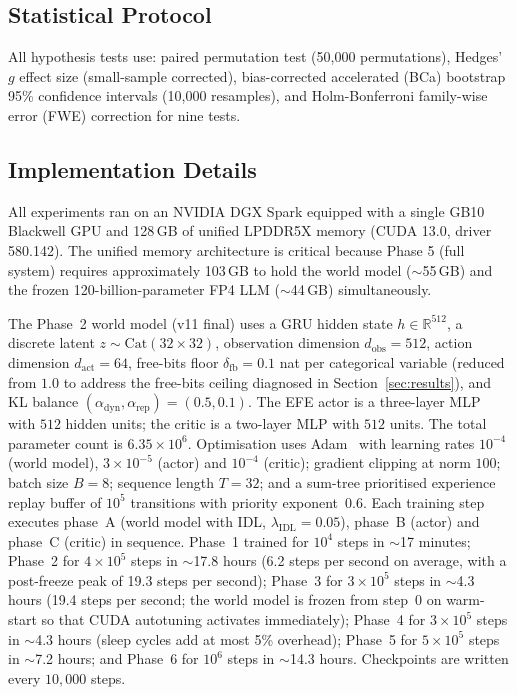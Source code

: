 \documentclass[journal,onecolumn,11pt]{IEEEtran}
\begin{document}
\subsection{Statistical Protocol}

All hypothesis tests use:
paired permutation test (50{,}000 permutations),
Hedges' $g$ effect size (small-sample corrected),
bias-corrected accelerated (BCa) bootstrap 95\% confidence intervals
(10{,}000 resamples),
and Holm-Bonferroni family-wise error (FWE) correction for nine tests.

\subsection{Implementation Details}

All experiments ran on an NVIDIA DGX Spark equipped with a single GB10
Blackwell GPU and 128\,GB of unified LPDDR5X memory (CUDA 13.0, driver
580.142).
The unified memory architecture is critical because Phase 5 (full system)
requires approximately 103\,GB to hold the world model ($\sim$55\,GB) and the
frozen 120-billion-parameter FP4 LLM ($\sim$44\,GB) simultaneously.

The Phase~2 world model (v11 final) uses a GRU hidden state
$h \in \mathbb{R}^{512}$, a discrete latent $z \sim \text{Cat}(32{\times}32)$,
observation dimension $d_{\text{obs}}=512$, action dimension
$d_{\text{act}}=64$, free-bits floor $\delta_{\text{fb}} = 0.1$ nat per
categorical variable (reduced from $1.0$ to address the free-bits ceiling
diagnosed in Section~\ref{sec:results}), and KL balance
$(\alpha_{\text{dyn}}, \alpha_{\text{rep}}) = (0.5, 0.1)$.
The EFE actor is a three-layer MLP with $512$ hidden units; the critic is a
two-layer MLP with $512$ units.
The total parameter count is $6.35\times 10^{6}$.
Optimisation uses Adam~\cite{kingma2014adam} with learning rates
$10^{-4}$ (world model), $3\times 10^{-5}$ (actor) and $10^{-4}$ (critic);
gradient clipping at norm $100$; batch size $B=8$; sequence length $T=32$;
and a sum-tree prioritised experience replay buffer of $10^{5}$ transitions
with priority exponent~$0.6$.
Each training step executes phase~A (world model with IDL,
$\lambda_{\text{IDL}} = 0.05$), phase~B (actor) and phase~C (critic) in
sequence.
Phase~1 trained for $10^{4}$ steps in $\sim$17 minutes;
Phase~2 for $4\times 10^{5}$ steps in $\sim$17.8 hours (6.2 steps per second
on average, with a post-freeze peak of 19.3 steps per second);
Phase~3 for $3\times 10^{5}$ steps in $\sim$4.3 hours (19.4 steps per
second; the world model is frozen from step~$0$ on warm-start so that
CUDA autotuning activates immediately);
Phase~4 for $3\times 10^{5}$ steps in $\sim$4.3 hours (sleep cycles add at
most 5\% overhead);
Phase~5 for $5\times 10^{5}$ steps in $\sim$7.2 hours;
and Phase~6 for $10^{6}$ steps in $\sim$14.3 hours.
Checkpoints are written every $10{,}000$ steps.
\end{document}
